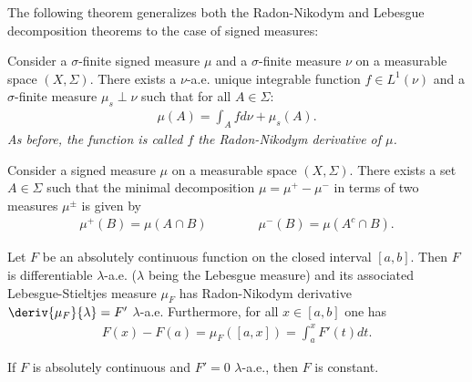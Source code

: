    The following theorem generalizes both the Radon-Nikodym and Lebesgue decomposition theorems to the case of signed measures:
    \begin{theorem}\label{lebesgue:signed_radon_nikodym}
        Consider a $\sigma$-finite signed measure $\mu$ and a $\sigma$-finite measure $\nu$ on a measurable space $(X,\Sigma)$. There exists a $\nu$-a.e. unique integrable function $f\in L^1(\nu)$ and a $\sigma$-finite measure $\mu_s\perp\nu$ such that for all $A\in\Sigma$:
        \begin{gather}
            \mu(A) = \int_Afd\nu + \mu_s(A).
        \end{gather}
        \emph{As before, the function is called $f$ the Radon-Nikodym derivative of $\mu$.}
    \end{theorem}

    \begin{theorem}
        Consider a signed measure $\mu$ on a measurable space $(X,\Sigma)$. There exists a set $A\in\Sigma$ such that the minimal decomposition $\mu=\mu^+-\mu^-$ in terms of two measures $\mu^\pm$ is given by
        \begin{gather}
            \mu^+(B) = \mu(A\cap B)\qquad\qquad\mu^-(B)=\mu(A^c\cap B).
        \end{gather}
    \end{theorem}



    \begin{theorem}
        Let $F$ be an absolutely continuous function on the closed interval $[a,b]$. Then $F$ is differentiable $\lambda$-a.e. ($\lambda$ being the Lebesgue measure) and its associated Lebesgue-Stieltjes measure $\mu_F$ has Radon-Nikodym derivative $\deriv{\mu_F}{\lambda}=F'$ $\lambda$-a.e. Furthermore, for all $x\in[a,b]$ one has
        \begin{gather}
            F(x) - F(a) = \mu_F([a,x]) = \int_a^xF'(t)dt.
        \end{gather}
    \end{theorem}
    \begin{result}
        If $F$ is absolutely continuous and $F'=0$ $\lambda$-a.e., then $F$ is constant.
    \end{result}